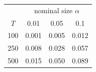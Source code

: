 % 
\begin{tabular}{cccc}
  \hline
  & \multicolumn{3}{c}{nominal size $\alpha$} \\
 $T$ & 0.01 & 0.05 & 0.1 \\
 \hline
100 & 0.001 & 0.005 & 0.012 \\ 
  250 & 0.008 & 0.028 & 0.057 \\ 
  500 & 0.015 & 0.050 & 0.089 \\ 
   \hline
\end{tabular}
